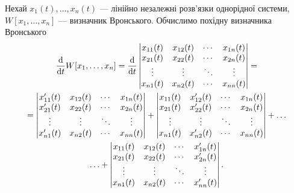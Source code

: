 Нехай $x_1(t), \ldots, x_n(t)$ --- лінійно незалежні розв'язки однорідної системи, $W[x_1, \ldots, x_n]$ --- визначник Вронського. Обчислимо похідну визначника Вронського
\begin{multline*}
	\frac{\mathop{}\!\mathrm{d}}{\mathop{}\!\mathrm{d} t} W[x_1, \ldots, x_n] = \frac{\mathop{}\!\mathrm{d}}{\mathop{}\!\mathrm{d} t} \begin{vmatrix} x_{11}(t) & x_{12}(t) & \cdots & x_{1n}(t) \\ x_{21}(t) & x_{22}(t) & \cdots & x_{2n}(t) \\ \vdots & \vdots & \ddots & \vdots \\ x_{n1}(t) & x_{n2}(t) & \cdots & x_{nn}(t) \end{vmatrix} = \\
	= \begin{vmatrix} x_{11}'(t) & x_{12}(t) & \cdots & x_{1n}(t) \\ x_{21}'(t) & x_{22}(t) & \cdots & x_{2n}(t) \\ \vdots & \vdots & \ddots & \vdots \\ x_{n1}'(t) & x_{n2}(t) & \cdots & x_{nn}(t) \end{vmatrix} + \begin{vmatrix} x_{11}(t) & x_{12}'(t) & \cdots & x_{1n}(t) \\ x_{21}(t) & x_{22}'(t) & \cdots & x_{2n}(t) \\ \vdots & \vdots & \ddots & \vdots \\ x_{n1}(t) & x_{n2}'(t) & \cdots & x_{nn}(t) \end{vmatrix} + \ldots \\
	\ldots + \begin{vmatrix} x_{11}(t) & x_{12}(t) & \cdots & x_{1n}'(t) \\ x_{21}(t) & x_{22}(t) & \cdots & x_{2n}'(t) \\ \vdots & \vdots & \ddots & \vdots \\ x_{n1}(t) & x_{n2}(t) & \cdots & x_{nn}'(t) \end{vmatrix}.
\end{multline*}

